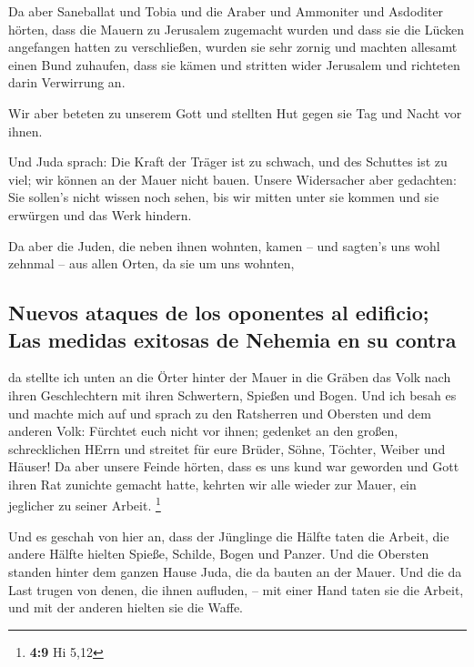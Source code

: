  Da aber Saneballat und Tobia und die Araber und Ammoniter
und Asdoditer hörten, dass die Mauern zu Jerusalem zugemacht wurden und
dass sie die Lücken angefangen hatten zu verschließen, wurden sie sehr
zornig  und machten allesamt einen Bund zuhaufen, dass sie
kämen und stritten wider Jerusalem und richteten darin Verwirrung an.

 Wir aber beteten zu unserem Gott und stellten Hut gegen
sie Tag und Nacht vor ihnen.

 Und Juda sprach: Die Kraft der Träger ist zu schwach, und
des Schuttes ist zu viel; wir können an der Mauer nicht bauen.
 Unsere Widersacher aber gedachten: Sie sollen's nicht
wissen noch sehen, bis wir mitten unter sie kommen und sie erwürgen und
das Werk hindern.

 Da aber die Juden, die neben ihnen wohnten, kamen -- und
sagten's uns wohl zehnmal -- aus allen Orten, da sie um uns wohnten,

\hypertarget{nuevos-ataques-de-los-oponentes-al-edificio-las-medidas-exitosas-de-nehemia-en-su-contra}{%
\subsection{Nuevos ataques de los oponentes al edificio; Las medidas
exitosas de Nehemia en su
contra}\label{nuevos-ataques-de-los-oponentes-al-edificio-las-medidas-exitosas-de-nehemia-en-su-contra}}

 da stellte ich unten an die Örter hinter der Mauer in die
Gräben das Volk nach ihren Geschlechtern mit ihren Schwertern, Spießen
und Bogen.  Und ich besah es und machte mich auf und
sprach zu den Ratsherren und Obersten und dem anderen Volk: Fürchtet
euch nicht vor ihnen; gedenket an den großen, schrecklichen HErrn und
streitet für eure Brüder, Söhne, Töchter, Weiber und Häuser!
 Da aber unsere Feinde hörten, dass es uns kund war
geworden und Gott ihren Rat zunichte gemacht hatte, kehrten wir alle
wieder zur Mauer, ein jeglicher zu seiner Arbeit. \footnote{\textbf{4:9}
  Hi 5,12}

 Und es geschah von hier an, dass der Jünglinge die
Hälfte taten die Arbeit, die andere Hälfte hielten Spieße, Schilde,
Bogen und Panzer. Und die Obersten standen hinter dem ganzen Hause Juda,
 die da bauten an der Mauer. Und die da Last trugen von
denen, die ihnen aufluden, -- mit einer Hand taten sie die Arbeit, und
mit der anderen hielten sie die Waffe.

